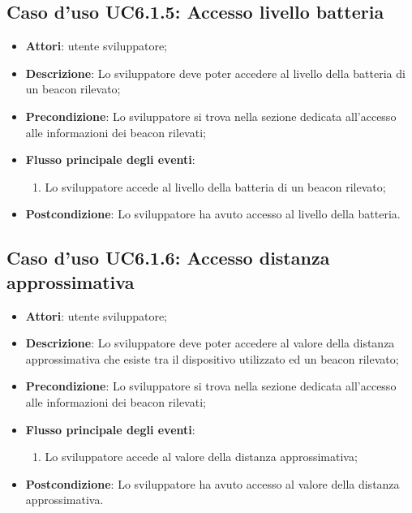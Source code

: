 \documentclass[../AnalisiDeiRequisiti.tex]{subfiles}
\begin{document}
\subsection{Caso d'uso UC6.1.5: Accesso livello batteria}
\begin{itemize}
\item \textbf{Attori}: utente sviluppatore;
\item \textbf{Descrizione}: Lo sviluppatore deve poter accedere al livello della batteria di un beacon rilevato; 
      \item \textbf{Precondizione}: Lo sviluppatore si trova nella sezione dedicata all'accesso alle informazioni dei beacon rilevati;

        \item \textbf{Flusso principale degli eventi}:
          \begin{enumerate}
          \item Lo sviluppatore accede al livello della batteria di un beacon rilevato;

      \end{enumerate}
    \item \textbf{Postcondizione}: Lo sviluppatore ha avuto accesso al livello della batteria.
  \end{itemize}
\hypertarget{UC6.1.6}{}
\subsection{Caso d'uso UC6.1.6: Accesso distanza approssimativa}
\begin{itemize}
\item \textbf{Attori}: utente sviluppatore;
\item \textbf{Descrizione}: Lo sviluppatore deve poter accedere al valore della distanza approssimativa che esiste tra il dispositivo utilizzato ed un beacon rilevato; 
      \item \textbf{Precondizione}: Lo sviluppatore si trova nella sezione dedicata all'accesso alle informazioni dei beacon rilevati;

        \item \textbf{Flusso principale degli eventi}:
          \begin{enumerate}
          \item Lo sviluppatore accede al valore della distanza approssimativa;

      \end{enumerate}
    \item \textbf{Postcondizione}: Lo sviluppatore ha avuto accesso al valore della distanza approssimativa.
  \end{itemize}
\hypertarget{UC6.1.7}{}
\end{document}
